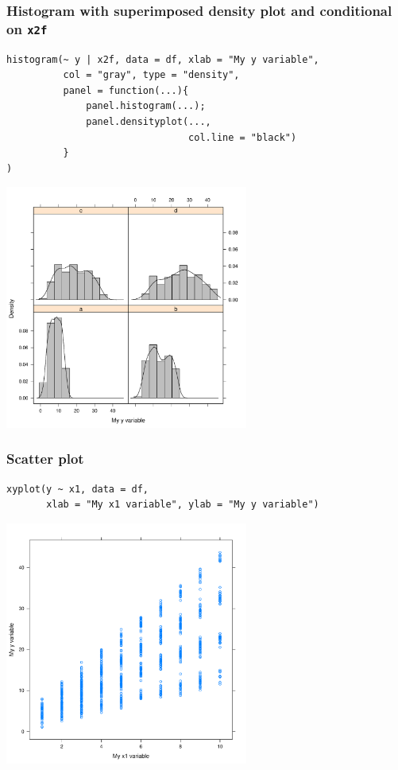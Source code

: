 \documentclass[bigger]{beamer}
\begin{document}
\begin{frame}[fragile,shrink = 10]
\frametitle{Histogram with superimposed density plot and conditional on \texttt{x2f}}
\label{sec-2_5}


\lstset{language=R}
\begin{lstlisting}
histogram(~ y | x2f, data = df, xlab = "My y variable", 
          col = "gray", type = "density",
          panel = function(...){
              panel.histogram(...);
              panel.densityplot(..., 
                                col.line = "black")
          }
)
\end{lstlisting}



\includegraphics[width=0.6\textwidth]{../graphs/lattice_hist_dens_g.pdf}
\end{frame}
\begin{frame}[fragile]
\frametitle{Scatter plot}
\label{sec-2_6}

\lstset{language=R}
\begin{lstlisting}
xyplot(y ~ x1, data = df, 
       xlab = "My x1 variable", ylab = "My y variable")
\end{lstlisting}



\includegraphics[width=0.6\textwidth]{../graphs/lattice_scatter.pdf}
\end{frame}
\end{document}
